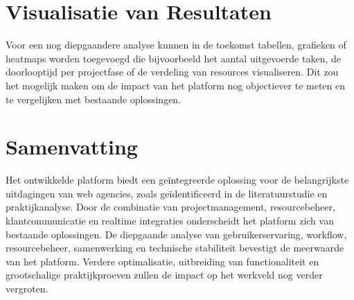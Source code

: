 \section{Visualisatie van Resultaten}
\label{sec:visualisatie}

Voor een nog diepgaandere analyse kunnen in de toekomst tabellen, grafieken of heatmaps worden toegevoegd die bijvoorbeeld het aantal uitgevoerde taken, de doorlooptijd per projectfase of de verdeling van resources visualiseren. Dit zou het mogelijk maken om de impact van het platform nog objectiever te meten en te vergelijken met bestaande oplossingen.

\section{Samenvatting}
\label{sec:samenvatting}

Het ontwikkelde platform biedt een geïntegreerde oplossing voor de belangrijkste uitdagingen van web agencies, zoals geïdentificeerd in de literatuurstudie en praktijkanalyse. Door de combinatie van projectmanagement, resourcebeheer, klantcommunicatie en realtime integraties onderscheidt het platform zich van bestaande oplossingen. De diepgaande analyse van gebruikerservaring, workflow, resourcebeheer, samenwerking en technische stabiliteit bevestigt de meerwaarde van het platform. Verdere optimalisatie, uitbreiding van functionaliteit en grootschalige praktijkproeven zullen de impact op het werkveld nog verder vergroten.

